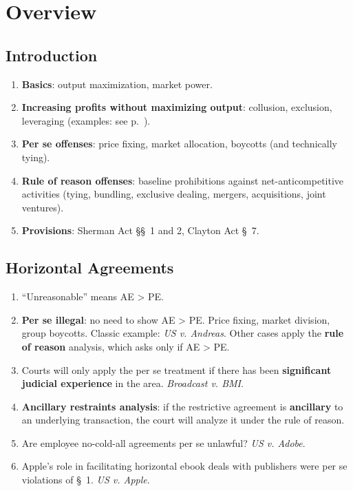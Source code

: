 \section{Overview}

\subsection{Introduction} 

\begin{enumerate}
    \item \textbf{Basics}: output maximization, market power.
    \item \textbf{Increasing profits without maximizing output}: collusion, 
    exclusion, leveraging (examples: see p.~\pageref{sub:conduct-examples}).
    \item \textbf{Per se offenses}: price fixing, market allocation, boycotts 
    (and technically tying).
    \item \textbf{Rule of reason offenses}: baseline prohibitions against 
    net-anticompetitive activities (tying, bundling, exclusive dealing, 
    mergers, acquisitions, joint ventures).
    \item \textbf{Provisions}: Sherman Act \S\S\ 1 and 2, Clayton Act \S\ 7.
\end{enumerate}

\subsection{Horizontal Agreements}

\begin{enumerate}
    \item ``Unreasonable'' means AE > PE.
    \item \textbf{Per se illegal}: no need to show AE > PE. Price fixing, market 
    division, group boycotts. Classic example: \emph{US v. Andreas}.
    Other cases apply the \textbf{rule of reason} 
    analysis, which asks only if AE > PE.
    \item Courts will only apply the per se treatment if there has been 
    \textbf{significant judicial experience} in the area. \emph{Broadcast v. 
    BMI}.
    \item \textbf{Ancillary restraints analysis}: if the restrictive agreement 
    is \textbf{ancillary} to an underlying transaction, the court will analyze 
    it under the rule of reason.
    \item Are employee no-cold-all agreements per se unlawful? \emph{US v. 
    Adobe}.
    \item Apple's role in facilitating horizontal ebook deals with publishers 
    were per se violations of \S\ 1. \emph{US v. Apple}.
\end{enumerate}


